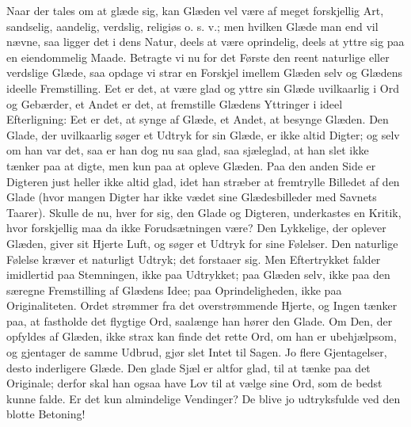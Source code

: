 \documentclass[12pt,a4paper]{book}
\begin{document}
Naar der tales om at glæde sig, kan Glæden vel være af
meget forskjellig Art, sandselig, aandelig, verdslig, religiøs o. s. v.; men
hvilken Glæde man end vil nævne, saa ligger det i dens Natur, deels at være
oprindelig, deels at yttre sig paa en eiendommelig Maade. Betragte vi nu for det
Første den reent naturlige eller verdslige Glæde, saa opdage vi strar en Forskjel
imellem Glæden selv og Glædens ideelle Fremstilling. Eet er det, at være glad og
yttre sin Glæde uvilkaarlig i Ord og Gebærder, et Andet er det, at fremstille
Glædens Yttringer i ideel Efterligning: Eet er det, at synge af Glæde, et Andet,
at besynge Glæden. Den Glade, der uvilkaarlig søger et Udtryk for sin Glæde, er
ikke altid Digter; og selv om han var det, saa er han dog nu saa glad, saa
sjæleglad, at han slet ikke tænker paa at digte, men kun paa at opleve Glæden. Paa
den anden Side er Digteren just heller ikke altid glad, idet han stræber at
fremtrylle Billedet af den Glade (hvor mangen Digter har ikke vædet sine
Glædesbilleder med Savnets Taarer). Skulle de nu, hver for sig, den Glade og
Digteren, underkastes en Kritik, hvor forskjellig maa da ikke Forudsætningen være?
Den Lykkelige, der oplever Glæden, giver sit Hjerte Luft, og søger et Udtryk for
sine Følelser. Den naturlige Følelse kræver et naturligt Udtryk; det forstaaer
sig. Men Eftertrykket falder imidlertid paa Stemningen, ikke paa Udtrykket; paa
Glæden selv, ikke paa den særegne Fremstilling af Glædens Idee; paa
Oprindeligheden, ikke paa Originaliteten. Ordet strømmer fra det overstrømmende
Hjerte, og Ingen tænker paa, at fastholde det flygtige Ord, saalænge han hører den
Glade. Om Den, der opfyldes af Glæden, ikke strax kan finde det rette Ord, om han
er ubehjælpsom, og gjentager de samme Udbrud, gjør slet Intet til Sagen. Jo flere
Gjentagelser, desto inderligere Glæde. Den glade Sjæl er altfor glad, til at tænke
paa det Originale; derfor skal han ogsaa have Lov til at vælge sine Ord, som de
bedst kunne falde. Er
det kun almindelige Vendinger? De blive jo udtryksfulde ved den blotte Betoning!
\end{document}
